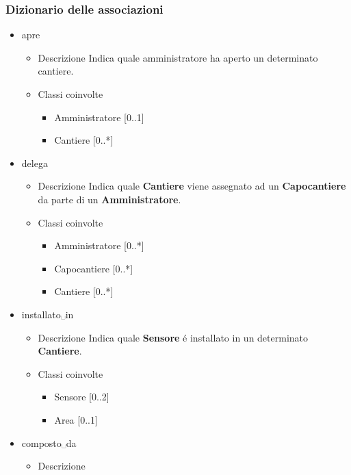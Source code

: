 \documentclass[11pt]{article}
\begin{document}
\subsubsection*{Dizionario delle associazioni}
\label{sec:org54ea169}
\begin{itemize}
\item apre
\label{sec:org2bf41e3}
\begin{itemize}
\item Descrizione
\label{sec:org215f5db}
Indica quale amministratore ha aperto un determinato cantiere.
\item Classi coinvolte
\label{sec:orgfbfc283}
\begin{itemize}
\item Amministratore [0..1]
\item Cantiere [0..*]
\end{itemize}
\end{itemize}
\item delega
\label{sec:org6235f35}
\begin{itemize}
\item Descrizione
\label{sec:org43d9243}
Indica quale \textbf{Cantiere} viene assegnato ad un \textbf{Capocantiere} da parte di un \textbf{Amministratore}.
\item Classi coinvolte
\label{sec:org56c2781}
\begin{itemize}
\item Amministratore [0..*]
\item Capocantiere [0..*]
\item Cantiere [0..*]
\end{itemize}
\end{itemize}
\item installato␣in
\label{sec:orgcb78723}
\begin{itemize}
\item Descrizione
\label{sec:org71c9f6f}
Indica quale \textbf{Sensore} é installato in un determinato \textbf{Cantiere}.
\item Classi coinvolte
\label{sec:org4e28770}
\begin{itemize}
\item Sensore [0..2]
\item Area [0..1]
\end{itemize}
\end{itemize}
\item composto␣da
\label{sec:org6117b02}
\begin{itemize}
\item Descrizione
\label{sec:org5f9a0ae}

\end{itemize}
\end{itemize}
\end{document}
